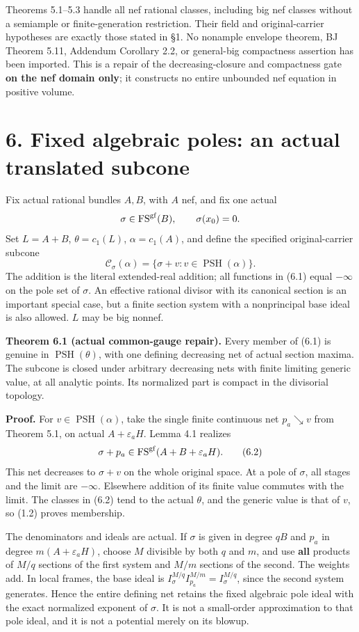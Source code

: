 \documentclass[10pt]{article}
\begin{document}
Theorems 5.1--5.3 handle all nef rational classes, including big nef
classes without a semiample or finite-generation restriction. Their
field and original-carrier hypotheses are exactly those stated in §1. No
nonample envelope theorem, BJ Theorem 5.11, Addendum Corollary 2.2, or
general-big compactness assertion has been imported. This is a repair of
the decreasing-closure and compactness gate \textbf{on the nef domain
only}; it constructs no entire unbounded nef equation in positive
volume.

\section{6. Fixed algebraic poles: an actual translated
subcone}\label{fixed-algebraic-poles-an-actual-translated-subcone}

Fix actual rational bundles \(A,B\), with \(A\) nef, and fix one actual
\[
 \sigma\in\operatorname{FS}^{\rm gf}(B),\qquad \sigma(x_0)=0.
\] Set \(L=A+B\), \(\theta=c_1(L)\), \(\alpha=c_1(A)\), and define the
specified original-carrier subcone \[
 \mathcal C_\sigma(\alpha)=
 \{\sigma+v:v\in\operatorname{PSH}(\alpha)\}.
 \tag{6.1}
\] The addition is the literal extended-real addition; all functions in
(6.1) equal \(-\infty\) on the pole set of \(\sigma\). An effective
rational divisor with its canonical section is an important special
case, but a finite section system with a nonprincipal base ideal is also
allowed. \(L\) may be big nonnef.

\textbf{Theorem 6.1 (actual common-gauge repair).} Every member of (6.1)
is genuine in \(\operatorname{PSH}(\theta)\), with one defining
decreasing net of actual section maxima. The subcone is closed under
arbitrary decreasing nets with finite limiting generic value, at all
analytic points. Its normalized part is compact in the divisorial
topology.

\textbf{Proof.} For \(v\in\operatorname{PSH}(\alpha)\), take the single
finite continuous net \(p_a\searrow v\) from Theorem 5.1, on actual
\(A+\varepsilon_aH\). Lemma 4.1 realizes \[
 \sigma+p_a\in\operatorname{FS}^{\rm gf}(A+B+\varepsilon_aH).
 \tag{6.2}
\] This net decreases to \(\sigma+v\) on the whole original space. At a
pole of \(\sigma\), all stages and the limit are \(-\infty\). Elsewhere
addition of its finite value commutes with the limit. The classes in
(6.2) tend to the actual \(\theta\), and the generic value is that of
\(v\), so (1.2) proves membership.

The denominators and ideals are actual. If \(\sigma\) is given in degree
\(qB\) and \(p_a\) in degree \(m(A+\varepsilon_aH)\), choose \(M\)
divisible by both \(q\) and \(m\), and use \textbf{all} products of
\(M/q\) sections of the first system and \(M/m\) sections of the second.
The weights add. In local frames, the base ideal is
\(I_\sigma^{M/q}I_{p_a}^{M/m}=I_\sigma^{M/q}\), since the second system
generates. Hence the entire defining net retains the fixed algebraic
pole ideal with the exact normalized exponent of \(\sigma\). It is not a
small-order approximation to that pole ideal, and it is not a potential
merely on its blowup.
\end{document}
